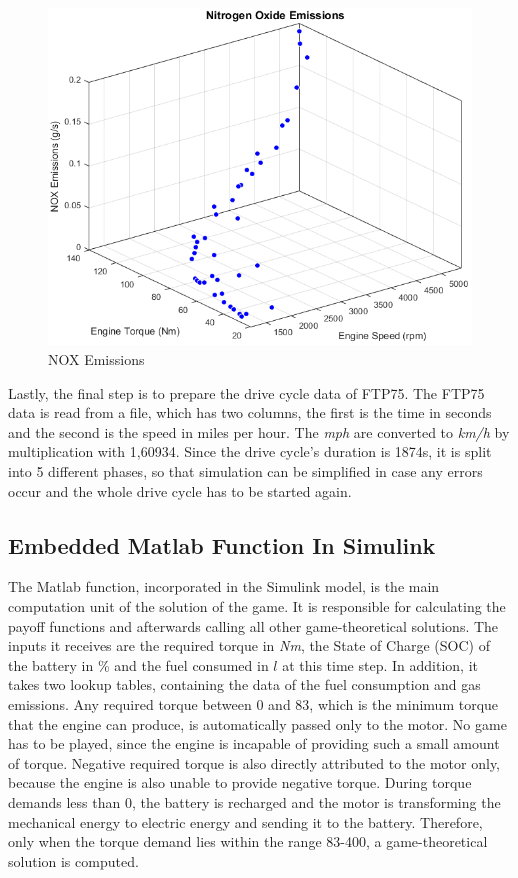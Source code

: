 \begin{figure}[h]
  \centering
  \includegraphics[scale=0.43]{figures/NOX}
  \caption{NOX Emissions}
  \label{fig:noxFit}
\end{figure}


Lastly, the final step is to prepare the drive cycle data of FTP75. The FTP75 data is read from a file, which has two columns, the first is the time in seconds and the second is the speed in miles per hour. The \textit{mph} are converted to \textit{km/h} by multiplication with 1,60934. Since the drive cycle's duration is 1874s, it is split into 5 different phases, so that simulation can be simplified in case any errors occur and the whole drive cycle has to be started again. 

\subsection{Embedded Matlab Function In Simulink}
\label{subsec:embeddedfunc}
The Matlab function, incorporated in the Simulink model, is the main computation unit of the solution of the game. It is responsible for calculating the payoff functions and afterwards calling all other game-theoretical solutions. The inputs it receives are the required torque in \textit{Nm}, the State of Charge (SOC) of the battery in \% and the fuel consumed in $l$ at this time step. In addition, it takes two lookup tables, containing the data of the fuel consumption and gas emissions. Any required torque between 0 and 83, which is the minimum torque that the engine can produce, is automatically passed only to the motor. No game has to be played, since the engine is incapable of providing such a small amount of torque. Negative required torque is also directly attributed to the motor only, because the engine is also unable to provide negative torque. During torque demands less than 0, the battery is recharged and the motor is transforming the mechanical energy to electric energy and sending it to the battery. Therefore, only when the torque demand lies within the range 83-400, a game-theoretical solution is computed.

